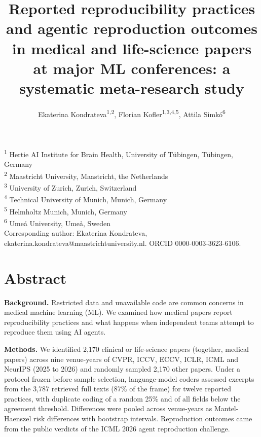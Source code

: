\documentclass[11pt]{article}
\title{Reported reproducibility practices and agentic reproduction outcomes in medical and life-science papers at major ML conferences: a systematic meta-research study}
\author{Ekaterina Kondrateva\textsuperscript{1,2}, Florian Kofler\textsuperscript{1,3,4,5}, Attila Simkó\textsuperscript{6}}
\date{}
\begin{document}
\maketitle
\begin{flushleft}\small
\textsuperscript{1} Hertie AI Institute for Brain Health, University of Tübingen, Tübingen, Germany \\ \textsuperscript{2} Maastricht University, Maastricht, the Netherlands \\ \textsuperscript{3} University of Zurich, Zurich, Switzerland \\ \textsuperscript{4} Technical University of Munich, Munich, Germany \\ \textsuperscript{5} Helmholtz Munich, Munich, Germany \\ \textsuperscript{6} Umeå University, Umeå, Sweden \\ Corresponding author: Ekaterina Kondrateva, ekaterina.kondrateva@maastrichtuniversity.nl. ORCID 0000-0003-3623-6106.
\end{flushleft}
\section*{Abstract}
\textbf{Background.} Restricted data and unavailable code are common concerns in medical machine learning (ML). We examined how medical papers report reproducibility practices and what happens when independent teams attempt to reproduce them using AI agents.

\textbf{Methods.} We identified 2,170 clinical or life-science papers (together, medical papers) across nine venue-years of CVPR, ICCV, ECCV, ICLR, ICML and NeurIPS (2025 to 2026) and randomly sampled 2,170 other papers. Under a protocol frozen before sample selection, language-model coders assessed excerpts from the 3,787 retrieved full texts (87\% of the frame) for twelve reported practices, with duplicate coding of a random 25\% and of all fields below the agreement threshold. Differences were pooled across venue-years as Mantel-Haenszel risk differences with bootstrap intervals. Reproduction outcomes came from the public verdicts of the ICML 2026 agent reproduction challenge.
\end{document}
